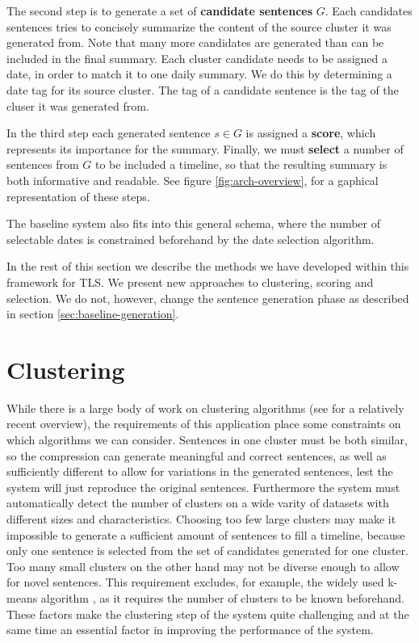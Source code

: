 \documentclass[a4paper,BCOR=10mm]{report}
\numberwithin{lemma}{chapter}
\numberwithin{definition}{chapter}
\begin{document}
The second step is to generate a set of \textbf{candidate sentences} $G$. Each candidates sentences tries to concisely summarize the content of the source cluster it was generated from. Note that many more candidates are generated than can be included in the final summary. Each cluster candidate needs to be assigned a date, in order to match it to one daily summary. We do this by determining a date tag for its source cluster. The tag of a candidate sentence is the tag of the cluser it was generated from.

In the third step each generated sentence $s \in G$ is assigned a \textbf{score}, which represents its importance for the summary.
Finally, we must \textbf{select} a number of sentences from $G$ to be included a timeline, so that the resulting summary is both informative and readable. See figure \ref{fig:arch-overview}, for a gaphical representation of these steps.

The baseline system also fits into this general schema, where the number of selectable dates is constrained beforehand by the date selection algorithm.

In the rest of this section we describe the methods we have developed within this framework for TLS. We present new approaches to clustering, scoring and selection. We do not, however, change the sentence generation phase as described in section \ref{sec:baseline-generation}.

\section{Clustering}

While there is a large body of work on clustering algorithms (see \citet{xu} for a relatively recent overview), the requirements of this application place some constraints on which algorithms we can consider. Sentences in one cluster must be both similar, so the compression can generate meaningful and correct sentences, as well as sufficiently different to allow for variations in the generated sentences, lest the system will just reproduce the original sentences.
Furthermore the system must automatically detect the number of clusters on a wide varity of datasets with different sizes and characteristics.
Choosing too few large clusters may make it impossible to generate a sufficient amount of sentences to fill a timeline, because only one sentence is selected from the set of candidates generated for one cluster. Too many small clusters on the other hand may not be diverse enough to allow for novel sentences.
This requirement excludes, for example, the widely used k-means algorithm \citet{kmeans}, as it requires the number of clusters to be known beforehand.
These factors make the clustering step of the system quite challenging and at the same time an essential factor in improving the performance of the system.
\end{document}
